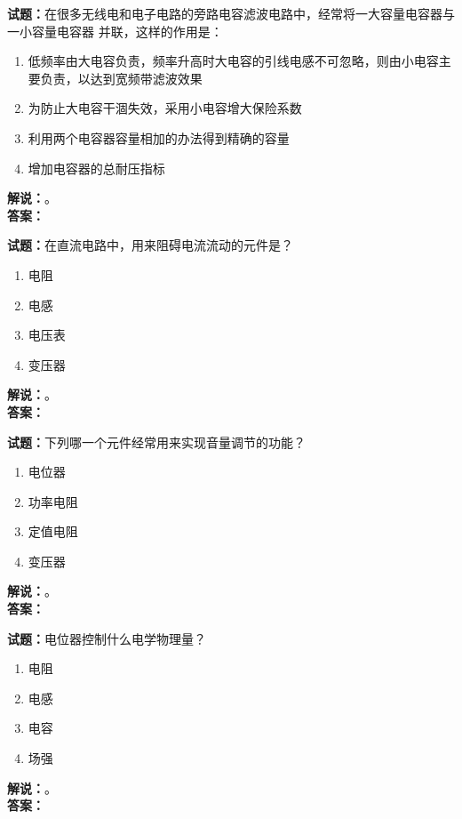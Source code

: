 \documentclass{ctexbook}
\begin{document}
\bigskip

\noindent\textbf{试题：}在很多无线电和电子电路的旁路电容滤波电路中，经常将一大容量电容器与一小容量电容器 并联，这样的作用是：
\begin{enumerate}[leftmargin=3em]
  \item 低频率由大电容负责，频率升高时大电容的引线电感不可忽略，则由小电容主要负责，以达到宽频带滤波效果
  \item 为防止大电容干涸失效，采用小电容增大保险系数
  \item 利用两个电容器容量相加的办法得到精确的容量
  \item 增加电容器的总耐压指标
\end{enumerate}
\noindent\textbf{解说：}\textbf{}。\\\noindent\textbf{答案：}

\bigskip

\noindent\textbf{试题：}在直流电路中，用来阻碍电流流动的元件是？
\begin{enumerate}[leftmargin=3em]
  \item 电阻
  \item 电感
  \item 电压表
  \item 变压器
\end{enumerate}
\noindent\textbf{解说：}\textbf{}。\\\noindent\textbf{答案：}

\bigskip

\noindent\textbf{试题：}下列哪一个元件经常用来实现音量调节的功能？
\begin{enumerate}[leftmargin=3em]
  \item 电位器
  \item 功率电阻
  \item 定值电阻
  \item 变压器
\end{enumerate}
\noindent\textbf{解说：}\textbf{}。\\\noindent\textbf{答案：}

\bigskip

\noindent\textbf{试题：}电位器控制什么电学物理量？
\begin{enumerate}[leftmargin=3em]
  \item 电阻
  \item 电感
  \item 电容
  \item 场强
\end{enumerate}
\noindent\textbf{解说：}\textbf{}。\\\noindent\textbf{答案：}
\end{document}
